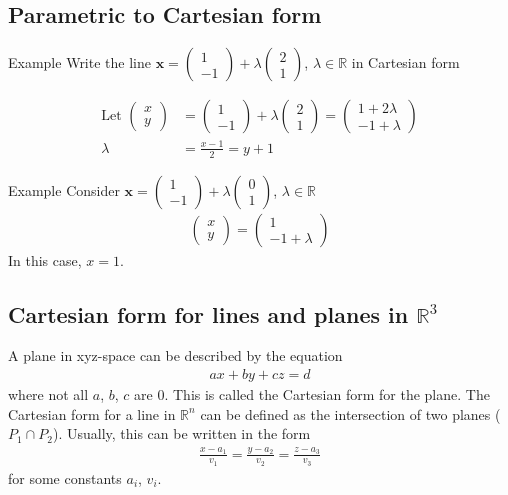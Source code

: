 \documentclass{report}
\newcommand{\cvec}[1]{ \begin{pmatrix} #1 \end{pmatrix} }
\begin{document}
	\subsection{Parametric to Cartesian form}

		\begin{question}{Example}
			Write the line $\mathbf{x} = \cvec{1\\-1} + \lambda \cvec{2\\1}$, $\lambda \in \mathbb{R}$ in Cartesian form

			\begin{align*}
				\text{Let } \cvec{x\\y} &= \cvec{1\\-1} + \lambda \cvec{2\\1} = \cvec{1+2\lambda\\-1+\lambda}	\\
								\lambda &= \frac{x-1}{2} = y + 1
			\end{align*}
		\end{question}

		\begin{question}{Example}
			Consider $\mathbf{x} = \cvec{1\\-1} + \lambda \cvec{0\\1}$, $\lambda \in \mathbb{R}$
			\begin{align*}
				\cvec{x\\y} = \cvec{1\\-1+\lambda}
			\end{align*}
			In this case, $x = 1$.
		\end{question}

	\subsection{Cartesian form for lines and planes in $\mathbb{R}^3$}

		A plane in xyz-space can be described by the equation
			\begin{align*}
				ax + by + cz = d
			\end{align*}
		where not all $a$, $b$, $c$ are $0$. This is called the Cartesian form for the plane. The Cartesian form for a line in $\mathbb{R}^n$ can be defined as the intersection of two planes ($P_1 \cap P_2$). Usually, this can be written in the form
			\begin{align*}
				\frac{x-a_1}{v_1} = \frac{y-a_2}{v_2} = \frac{z-a_3}{v_3}
			\end{align*}
		for some constants $a_i$, $v_i$.
\end{document}
